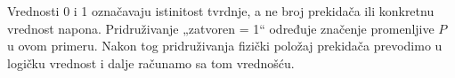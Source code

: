 
Vrednosti 0 i 1 označavaju istinitost tvrdnje, a ne broj prekidača ili konkretnu vrednost napona. Pridruživanje „zatvoren = 1“ određuje značenje promenljive \(P\) u ovom primeru. Nakon tog pridruživanja fizički položaj prekidača prevodimo u logičku vrednost i dalje računamo sa tom vrednošću.
